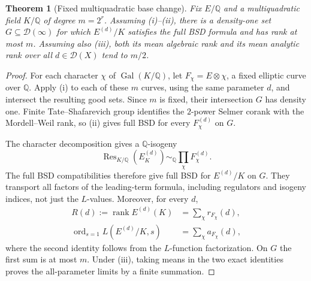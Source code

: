 \documentclass[11pt]{article}
\newtheorem{theorem}{Theorem}[section]
\theoremstyle{definition}
\theoremstyle{remark}
\newcommand{\Q}{\mathbb Q}
\DeclareMathOperator{\rank}{rank}
\DeclareMathOperator{\Res}{Res}
\DeclareMathOperator{\Gal}{Gal}
\DeclareMathOperator{\ord}{ord}
\begin{document}
\begin{theorem}[Fixed multiquadratic base change]\label{thm:bsd}
Fix $E/\Q$ and a multiquadratic field $K/\Q$ of degree $m=2^r$. Assuming (i)--(ii), there is a density-one set $G\subseteq\mathcal D(\infty)$ for which $E^{(d)}/K$ satisfies the full BSD formula and has rank at most $m$. Assuming also (iii), both its mean algebraic rank and its mean analytic rank over all $d\in\mathcal D(X)$ tend to $m/2$.
\end{theorem}
\begin{proof}
For each character $\chi$ of $\Gal(K/\Q)$, let $F_\chi=E\otimes\chi$, a fixed elliptic curve over $\Q$. Apply (i) to each of these $m$ curves, using the same parameter $d$, and intersect the resulting good sets. Since $m$ is fixed, their intersection $G$ has density one. Finite Tate--Shafarevich group identifies the $2$-power Selmer corank with the Mordell--Weil rank, so (ii) gives full BSD for every $F_\chi^{(d)}$ on $G$.

The character decomposition gives a $\Q$-isogeny
\[
\Res_{K/\Q}(E^{(d)}_K)\sim_{\Q}\prod_{\chi}F_\chi^{(d)}.
\]
The full BSD compatibilities therefore give full BSD for $E^{(d)}/K$ on $G$. They transport all factors of the leading-term formula, including regulators and isogeny indices, not just the $L$-values. Moreover, for every $d$,
\begin{align}
R(d):=\rank E^{(d)}(K)&=\sum_\chi r_{F_\chi}(d),\label{eq:rank}\\
\ord_{s=1}L(E^{(d)}/K,s)&=\sum_\chi a_{F_\chi}(d),\label{eq:analytic}
\end{align}
where the second identity follows from the $L$-function factorization. On $G$ the first sum is at most $m$. Under (iii), taking means in the two exact identities proves the all-parameter limits by a finite summation.
\end{proof}
\end{document}
